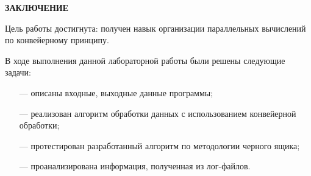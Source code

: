 \begin{center}
    \textbf{ЗАКЛЮЧЕНИЕ}
\end{center}

Цель работы достигнута: получен навык организации параллельных вычислений по конвейерному принципу.

\vspace{5mm}

В ходе выполнения данной лабораторной работы были решены следующие задачи:
\begin{itemize}
	\item[---] описаны входные, выходные данные программы;
	\item[---] реализован алгоритм обработки данных с использованием конвейерной обработки;
	\item[---] протестирован разработанный алгоритм по методологии черного ящика;
        \item[---] проанализирована информация, полученная из лог-файлов.
\end{itemize}
